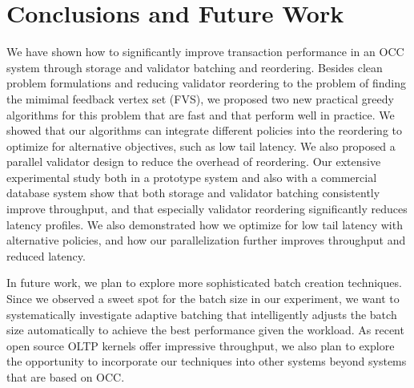 \section{Conclusions and Future Work}\label{sec:conclusion}

We have shown how to significantly improve transaction performance in an OCC system through storage and validator batching and reordering. Besides clean problem formulations and
reducing validator reordering to the problem of finding the mimimal feedback vertex set (FVS), we proposed two new practical greedy algorithms for this problem
that are fast and that perform well in practice. We showed that our algorithms can integrate different policies into the reordering to optimize for alternative objectives, 
such as low tail latency. We also proposed a parallel validator design to reduce the overhead of reordering. Our extensive experimental study both in a prototype system and also with a commercial database system show that both storage and validator batching consistently improve throughput, and that especially validator reordering 
significantly reduces latency profiles. We also demonstrated how we optimize for low tail latency with alternative policies, and how our parallelization further improves
throughput and reduced latency.

In future work, we plan to explore more sophisticated batch creation techniques. Since we observed a sweet spot for the  batch size in our experiment, we want to systematically investigate adaptive batching that intelligently adjusts the batch size automatically to achieve the best performance given the workload. As recent open source OLTP kernels offer impressive throughput, we also plan to explore the opportunity to incorporate our techniques into other systems beyond systems that are based on OCC.
